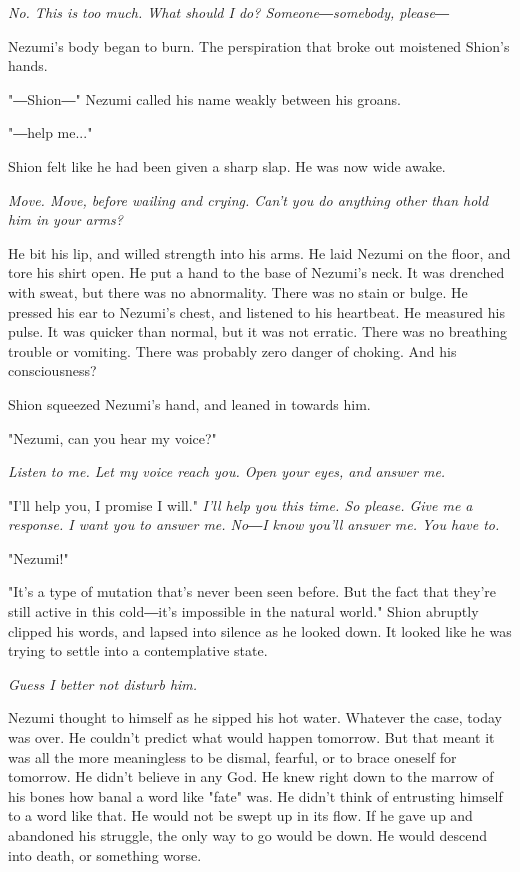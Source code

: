 \emph{No. This is too much. What should I do? Someone―somebody, please―}

Nezumi's body began to burn. The perspiration that broke out moistened
Shion's hands.

"―Shion―" Nezumi called his name weakly between his groans.

"―help me..."

Shion felt like he had been given a sharp slap. He was now wide awake.

\emph{Move. Move, before wailing and crying. Can't you do anything other than
hold him in your arms?}

He bit his lip, and willed strength into his arms. He laid Nezumi on the
floor, and tore his shirt open. He put a hand to the base of Nezumi's
neck. It was drenched with sweat, but there was no abnormality. There
was no stain or bulge. He pressed his ear to Nezumi's chest, and
listened to his heartbeat. He measured his pulse. It was quicker than
normal, but it was not erratic. There was no breathing trouble or
vomiting. There was probably zero danger of choking. And his
consciousness?

Shion squeezed Nezumi's hand, and leaned in towards him.

"Nezumi, can you hear my voice?"

\emph{Listen to me. Let my voice reach you. Open your eyes, and answer me.}

"I'll help you, I promise I will." \emph{I'll help you this time. So please.
Give me a response. I want you to answer me. No―I know you'll answer me.
You have to.}

"Nezumi!"

\myspace

"It's a type of mutation that's never been seen before. But the fact
that they're still active in this cold―it's impossible in the natural
world." Shion abruptly clipped his words, and lapsed into silence as he
looked down. It looked like he was trying to settle into a contemplative
state.

\emph{Guess I better not disturb him.}

Nezumi thought to himself as he sipped his hot water. Whatever the case,
today was over. He couldn't predict what would happen tomorrow. But that
meant it was all the more meaningless to be dismal, fearful, or to brace
oneself for tomorrow. He didn't believe in any God. He knew right down
to the marrow of his bones how banal a word like "fate" was. He didn't
think of entrusting himself to a word like that. He would not be swept
up in its flow. If he gave up and abandoned his struggle, the only way
to go would be down. He would descend into death, or something worse.

